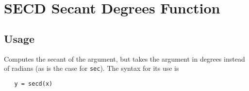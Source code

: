 \section{SECD Secant Degrees Function}

\subsection{Usage}

Computes the secant of the argument, but takes
the argument in degrees instead of radians (as is the case
for \verb|sec|). The syntax for its use is
\begin{verbatim}
   y = secd(x)
\end{verbatim}
